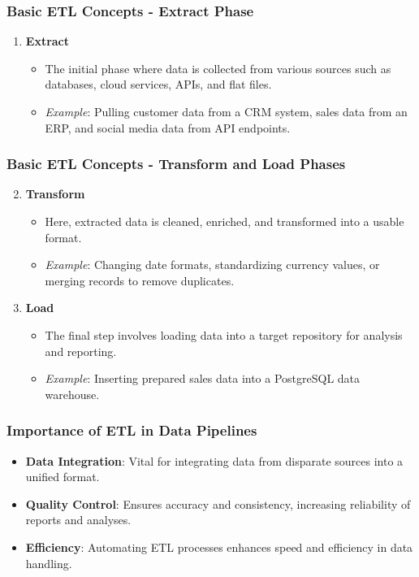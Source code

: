 \documentclass[aspectratio=169]{beamer}
\begin{document}
\begin{frame}
  \frametitle{Basic ETL Concepts - Extract Phase}
  \begin{enumerate}
    \item \textbf{Extract}
      \begin{itemize}
        \item The initial phase where data is collected from various sources such as databases, cloud services, APIs, and flat files.
        \item \textit{Example}: Pulling customer data from a CRM system, sales data from an ERP, and social media data from API endpoints.
      \end{itemize}
  \end{enumerate}
\end{frame}

\begin{frame}
  \frametitle{Basic ETL Concepts - Transform and Load Phases}
  \begin{enumerate}
    \setcounter{enumi}{1} %
    \item \textbf{Transform}
      \begin{itemize}
        \item Here, extracted data is cleaned, enriched, and transformed into a usable format.
        \item \textit{Example}: Changing date formats, standardizing currency values, or merging records to remove duplicates.
      \end{itemize}
      
    \item \textbf{Load}
      \begin{itemize}
        \item The final step involves loading data into a target repository for analysis and reporting.
        \item \textit{Example}: Inserting prepared sales data into a PostgreSQL data warehouse.
      \end{itemize}
  \end{enumerate}
\end{frame}

\begin{frame}
  \frametitle{Importance of ETL in Data Pipelines}
  \begin{itemize}
    \item \textbf{Data Integration}: Vital for integrating data from disparate sources into a unified format.
    \item \textbf{Quality Control}: Ensures accuracy and consistency, increasing reliability of reports and analyses.
    \item \textbf{Efficiency}: Automating ETL processes enhances speed and efficiency in data handling.
  \end{itemize}
\end{frame}
\end{document}
